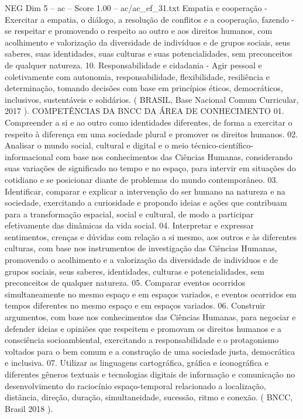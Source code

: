 \begin{textsample}{NEG Dim 5 – ac – Score 1.00 – ac/ac\_ef\_31.txt}
Empatia e cooperação - Exercitar a empatia, o diálogo, a resolução de conflitos e a cooperação, fazendo -se respeitar e promovendo o respeito ao outro e aos direitos humanos, com acolhimento e valorização da diversidade de indivíduos e de grupos sociais, seus saberes, suas identidades, suas culturas e suas potencialidades, sem preconceitos de qualquer natureza. 10.
Responsabilidade e cidadania - Agir pessoal e coletivamente com autonomia, responsabilidade, flexibilidade, resiliência e determinação, tomando decisões com base em princípios éticos, democráticos, inclusivos, sustentáveis e solidários. ( BRASIL, Base Nacional Comum Curricular, 2017 ).
COMPETÊNCIAS DA BNCC DA ÁREA DE CONHECIMENTO 01.
Compreender a si e ao outro como identidades diferentes, de forma a exercitar o respeito à diferença em uma sociedade plural e promover os direitos humanos. 02.
Analisar o mundo social, cultural e digital e o meio técnico-científico-informacional com base nos conhecimentos das Ciências Humanas, considerando suas variações de significado no tempo e no espaço, para intervir em situações do cotidiano e se posicionar diante de problemas do mundo contemporâneo. 03.
Identificar, comparar e explicar a intervenção do ser humano na natureza e na sociedade, exercitando a curiosidade e propondo ideias e ações que contribuam para a transformação espacial, social e cultural, de modo a participar efetivamente das dinâmicas da vida social. 04.
Interpretar e expressar sentimentos, crenças e dúvidas com relação a si mesmo, aos outros e às diferentes culturas, com base nos instrumentos de investigação das Ciências Humanas, promovendo o acolhimento e a valorização da diversidade de indivíduos e de grupos sociais, seus saberes, identidades, culturas e potencialidades, sem preconceitos de qualquer natureza. 05.
Comparar eventos ocorridos simultaneamente no mesmo espaço e em espaços variados, e eventos ocorridos em tempos diferentes no mesmo espaço e em espaços variados. 06.
Construir argumentos, com base nos conhecimentos das Ciências Humanas, para negociar e defender ideias e opiniões que respeitem e promovam os direitos humanos e a consciência socioambiental, exercitando a responsabilidade e o protagonismo voltados para o bem comum e a construção de uma sociedade justa, democrática e inclusiva. 07.
Utilizar as linguagens cartográfica, gráfica e iconográfica e diferentes gêneros textuais e tecnologias digitais de informação e comunicação no desenvolvimento do raciocínio espaço-temporal relacionado a localização, distância, direção, duração, simultaneidade, sucessão, ritmo e conexão. ( BNCC, Brasil 2018 ).

\end{textsample}
